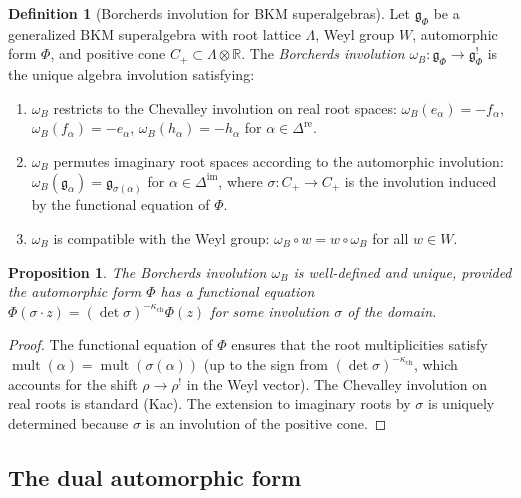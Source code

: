 \documentclass[11pt]{article}
\newtheorem{proposition}[theorem]{Proposition}
\theoremstyle{definition}
\newtheorem{definition}[theorem]{Definition}
\theoremstyle{remark}
\DeclareMathOperator{\mult}{mult}
\newcommand{\fkg}{\mathfrak{g}}
\begin{document}
\begin{definition}[Borcherds involution for BKM superalgebras]
\label{def:borcherds-involution-general}
Let $\fkg_\Phi$ be a generalized BKM superalgebra with root lattice
$\Lambda$, Weyl group $W$, automorphic form $\Phi$, and positive
cone $C_+ \subset \Lambda \otimes \mathbb{R}$. The \emph{Borcherds
involution} $\omega_B \colon \fkg_\Phi \to \fkg_\Phi^!$ is the
unique algebra involution satisfying:
\begin{enumerate}[label=(\roman*)]
\item $\omega_B$ restricts to the Chevalley involution on real root
spaces: $\omega_B(e_\alpha) = -f_\alpha$,
$\omega_B(f_\alpha) = -e_\alpha$, $\omega_B(h_\alpha) = -h_\alpha$
for $\alpha \in \Delta^{\mathrm{re}}$.
\item $\omega_B$ permutes imaginary root spaces according to the
automorphic involution: $\omega_B(\fkg_\alpha) = \fkg_{\sigma(\alpha)}$
for $\alpha \in \Delta^{\mathrm{im}}$, where
$\sigma \colon C_+ \to C_+$ is the involution induced by the
functional equation of $\Phi$.
\item $\omega_B$ is compatible with the Weyl group:
$\omega_B \circ w = w \circ \omega_B$ for all $w \in W$.
\end{enumerate}
\end{definition}

\begin{proposition}
The Borcherds involution $\omega_B$ is well-defined and unique,
provided the automorphic form $\Phi$ has a functional equation
$\Phi(\sigma \cdot z) = (\det \sigma)^{-\kappa_{\mathrm{ch}}} \Phi(z)$ for some
involution $\sigma$ of the domain.
\end{proposition}

\begin{proof}
The functional equation of $\Phi$ ensures that the root multiplicities
satisfy $\mult(\alpha) = \mult(\sigma(\alpha))$ (up to the sign from
$(\det \sigma)^{-\kappa_{\mathrm{ch}}}$, which accounts for the shift $\rho \to \rho^!$
in the Weyl vector). The Chevalley involution on real roots is standard
(Kac). The extension to imaginary roots by $\sigma$ is uniquely
determined because $\sigma$ is an involution of the positive cone.
\end{proof}

\subsection{The dual automorphic form}
\end{document}
